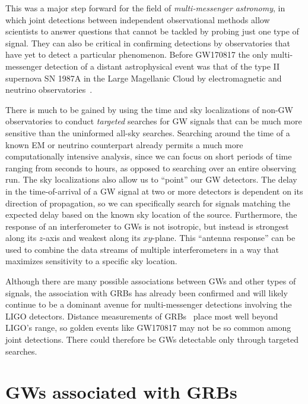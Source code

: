 This was a major step forward for the field of \textit{multi-messenger astronomy}, in which joint detections between independent observational methods allow scientists to answer questions that cannot be tackled by probing just one type of signal.
They can also be critical in confirming detections by observatories that have yet to detect a particular phenomenon.
Before GW170817 the only multi-messenger detection of a distant astrophysical event was that of the type II supernova SN 1987A in the Large Magellanic Cloud by electromagnetic and neutrino observatories~\citep{Hirata_1987, Bionta_1987, Alekseev_1988}.

There is much to be gained by using the time and sky localizations of non-GW observatories to conduct \textit{targeted} searches for GW signals that can be much more sensitive than the uninformed all-sky searches.
Searching around the time of a known EM or neutrino counterpart already permits a much more computationally intensive analysis, since we can focus on short periods of time ranging from seconds to hours, as opposed to searching over an entire observing run.
The sky localizations also allow us to ``point'' our GW detectors.
The delay in the time-of-arrival of a GW signal at two or more detectors is dependent on its direction of propagation, so we can specifically search for signals matching the expected delay based on the known sky location of the source.
Furthermore, the response of an interferometer to GWs is not isotropic, but instead is strongest along its $z$-axis and weakest along its $xy$-plane.
This ``antenna response'' can be used to combine the data streams of multiple interferometers in a way that maximizes sensitivity to a specific sky location.

Although there are many possible associations between GWs and other types of signals, the association with \acp{GRB} has already been confirmed and will likely continue to be a dominant avenue for multi-messenger detections involving the LIGO detectors.
Distance measurements of GRBs~\citep{swift_archive} place most well beyond LIGO's range, so golden events like GW170817 may not be so common among joint detections.
There could therefore be GWs detectable only through targeted searches.


\section{GWs associated with GRBs}\label{sec:gw-grb}

